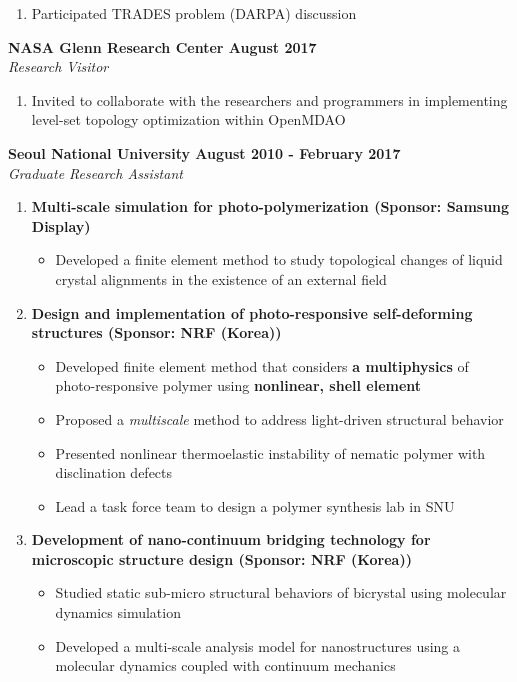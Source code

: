 \documentclass[margin, 10pt]{res} %
\begin{document}
\begin{resume}
\begin{enumerate}
    \item Participated TRADES problem (DARPA) discussion
\end{enumerate}

\textbf{NASA Glenn Research Center \hfill August 2017} \\
\textit{Research Visitor}

\begin{enumerate}
    \item Invited to collaborate with the researchers and programmers in implementing level-set topology optimization within OpenMDAO
\end{enumerate}

\textbf{Seoul National University \hfill August 2010 - February 2017} \\
\textit{Graduate Research Assistant}

\begin{enumerate}
    \item \textbf{Multi-scale simulation for photo-polymerization (Sponsor: Samsung Display)}
    \begin{itemize}
        \item Developed a finite element method to study topological changes of liquid crystal alignments in the existence of an external field 
    \end{itemize}
    
    \item \textbf{Design and implementation of photo-responsive self-deforming structures 
    (Sponsor: NRF (Korea))}
    \begin{itemize}
        \item Developed finite element method that considers \textbf{a multiphysics} of photo-responsive polymer using \textbf{nonlinear, shell element}
        \item Proposed a \textit{multiscale} method to address light-driven structural behavior
        \item Presented nonlinear thermoelastic instability of nematic polymer with disclination defects
        \item Lead a task force team to design a polymer synthesis lab in SNU
    \end{itemize}
    
    \item \textbf{Development of nano-continuum bridging technology for microscopic structure design (Sponsor: NRF (Korea))}
    \begin{itemize}
        \item Studied static sub-micro structural behaviors of bicrystal using molecular dynamics simulation
        \item Developed a multi-scale analysis model for nanostructures using a molecular dynamics coupled with continuum mechanics 
        

\end{itemize}
\end{enumerate}
\end{resume}
\end{document}
